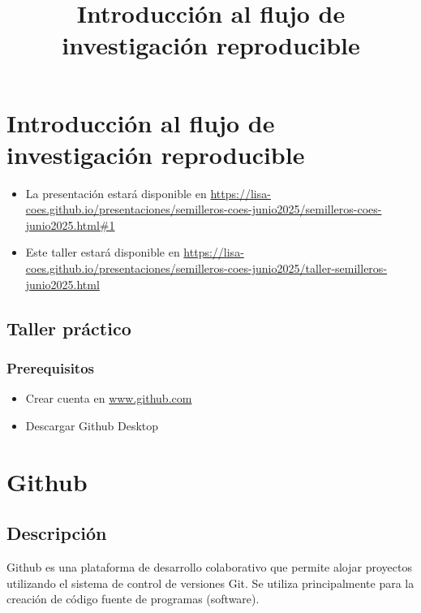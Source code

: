 \documentclass[
  letterpaper,
  DIV=11,
  numbers=noendperiod]{scrartcl}
\title{Introducción al flujo de investigación reproducible}
\author{}
\date{}
\begin{document}
\maketitle


\section{Introducción al flujo de investigación
reproducible}\label{introducciuxf3n-al-flujo-de-investigaciuxf3n-reproducible}

\begin{itemize}
\item
  La presentación estará disponible en
  \url{https://lisa-coes.github.io/presentaciones/semilleros-coes-junio2025/semilleros-coes-junio2025.html\#1}
\item
  Este taller estará disponible en
  \url{https://lisa-coes.github.io/presentaciones/semilleros-coes-junio2025/taller-semilleros-junio2025.html}
\end{itemize}

\subsection{Taller práctico}\label{taller-pruxe1ctico}

\subsubsection{Prerequisitos}\label{prerequisitos}

\begin{itemize}
\item
  Crear cuenta en \url{www.github.com}
\item
  Descargar Github Desktop
\end{itemize}

\section{Github}\label{github}

\subsection{Descripción}\label{descripciuxf3n}

Github es una plataforma de desarrollo colaborativo que permite alojar
proyectos utilizando el sistema de control de versiones Git. Se utiliza
principalmente para la creación de código fuente de programas
(software).
\end{document}
